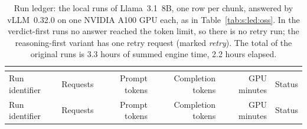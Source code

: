 {\scriptsize
\setlength{\tabcolsep}{3pt}
\begin{longtable}{@{}p{4.9cm}rrrrl@{}}
\caption{Run ledger: the local runs of Llama~3.1~8B, one row per chunk, answered by vLLM~0.32.0 on one NVIDIA A100 GPU each, as in Table~\ref{tab:s:led:oss}. In the verdict-first runs no answer reached the token limit, so there is no retry run; the reasoning-first variant has one retry request (marked \emph{retry}). The total of the original runs is 3.3 hours of summed engine time, 2.2 hours elapsed.}\\
\label{tab:s:led:llama}\\
\toprule
Run identifier & Requests & Prompt tokens & Completion tokens & GPU minutes & Status \\
\midrule
\endfirsthead
\toprule
Run identifier & Requests & Prompt tokens & Completion tokens & GPU minutes & Status \\
\midrule
\endhead


\end{longtable}}

